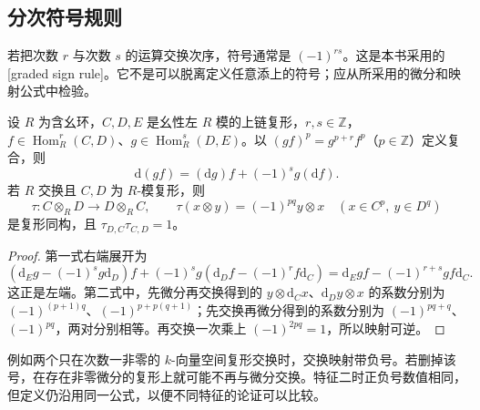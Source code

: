 \subsection{分次符号规则}
\label{b4:subsec:0502:03}

若把次数 \(r\) 与次数 \(s\) 的运算交换次序，符号通常是 \((-1)^{rs}\)。这是本书采用的[graded sign rule]。它不是可以脱离定义任意添上的符号；应从所采用的微分和映射公式中检验。

\begin{proposition}\label{b4:prop:graded-leibniz}
设 \(R\) 为含幺环，\(C,D,E\) 是幺性左 \(R\) 模的上链复形，\(r,s\in\mathbb Z\)，\(f\in\operatorname{Hom}_R^r(C,D)\)、\(g\in\operatorname{Hom}_R^s(D,E)\)。以 \((gf)^p=g^{p+r}f^p\)（\(p\in\mathbb Z\)）定义复合，则
\[
\mathrm{d}(gf)=(\mathrm{d}g)f+(-1)^s g(\mathrm{d}f).
\]
若 \(R\) 交换且 \(C,D\) 为 \(R\)-模复形，则
\[
\tau:C\otimes_R D\longrightarrow D\otimes_R C,
\qquad \tau(x\otimes y)=(-1)^{pq}y\otimes x
\quad(x\in C^p,\ y\in D^q)
\]
是复形同构，且 \(\tau_{D,C}\tau_{C,D}=1\)。
\end{proposition}
\begin{proof}
第一式右端展开为
\[
(\mathrm{d}_Eg-(-1)^sg\mathrm{d}_D)f+(-1)^sg(\mathrm{d}_Df-(-1)^rf\mathrm{d}_C)
=\mathrm{d}_Egf-(-1)^{r+s}gf\mathrm{d}_C.
\]
这正是左端。第二式中，先微分再交换得到的 \(y\otimes \mathrm{d}_Cx\)、\(\mathrm{d}_Dy\otimes x\) 的系数分别为 \((-1)^{(p+1)q}\)、\((-1)^{p+p(q+1)}\)；先交换再微分得到的系数分别为 \((-1)^{pq+q}\)、\((-1)^{pq}\)，两对分别相等。再交换一次乘上 \((-1)^{2pq}=1\)，所以映射可逆。
\end{proof}

例如两个只在次数一非零的 \(k\)-向量空间复形交换时，交换映射带负号。若删掉该号，在存在非零微分的复形上就可能不再与微分交换。特征二时正负号数值相同，但定义仍沿用同一公式，以便不同特征的论证可以比较。
